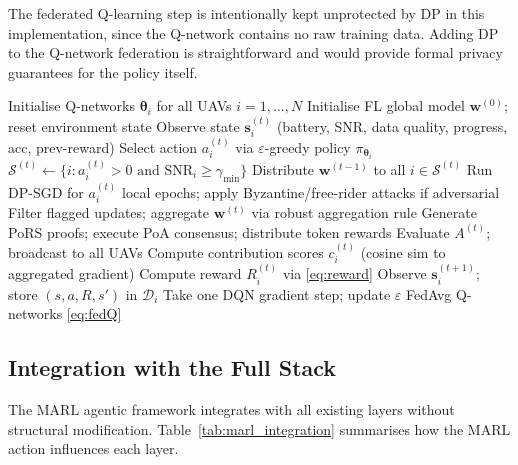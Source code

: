 \documentclass[12pt,a4paper]{article}
\begin{document}
The federated Q-learning step is intentionally kept unprotected by DP in this
implementation, since the Q-network contains no raw training data.  Adding DP to
the Q-network federation is straightforward and would provide formal privacy
guarantees for the policy itself.

\begin{algorithm}[H]
\caption{MARL-FL: One episode of $T$ rounds}
\begin{algorithmic}[1]
\State Initialise Q-networks $\boldsymbol{\theta}_i$ for all UAVs $i=1,\ldots,N$
\State Initialise FL global model $\mathbf{w}^{(0)}$; reset environment state
    \State Observe state $\mathbf{s}_i^{(t)}$ (battery, SNR, data quality, progress, acc, prev-reward)
    \State Select action $a_i^{(t)}$ via $\varepsilon$-greedy policy $\pi_{\boldsymbol{\theta}_i}$
  \EndFor
  \State $\mathcal{S}^{(t)} \leftarrow \{i : a_i^{(t)} > 0 \text{ and } \mathrm{SNR}_i \geq \gamma_{\min}\}$
  \State Distribute $\mathbf{w}^{(t-1)}$ to all $i \in \mathcal{S}^{(t)}$
    \State Run DP-SGD for $a_i^{(t)}$ local epochs; apply Byzantine/free-rider attacks if adversarial
  \EndFor
  \State Filter flagged updates; aggregate $\mathbf{w}^{(t)}$ via robust aggregation rule
  \State Generate PoRS proofs; execute PoA consensus; distribute token rewards
  \State Evaluate $A^{(t)}$; broadcast to all UAVs
  \State Compute contribution scores $c_i^{(t)}$ (cosine sim to aggregated gradient)
    \State Compute reward $R_i^{(t)}$ via \eqref{eq:reward}
    \State Observe $\mathbf{s}_i^{(t+1)}$; store $(s, a, R, s')$ in $\mathcal{D}_i$
    \State Take one DQN gradient step; update $\varepsilon$
  \EndFor
   FedAvg Q-networks \eqref{eq:fedQ} \EndIf
\EndFor
\end{algorithmic}
\end{algorithm}

\subsection{Integration with the Full Stack}

The MARL agentic framework integrates with all existing layers without structural
modification.  Table~\ref{tab:marl_integration} summarises how the MARL action
influences each layer.
\end{document}
